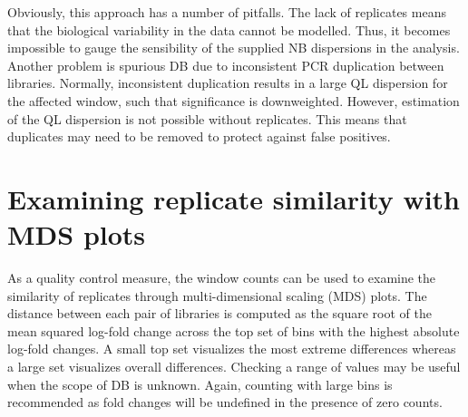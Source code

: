 \documentclass{report}\usepackage[]{graphicx}\usepackage[usenames,dvipsnames]{color}
\newcommand{\hlnum}[1]{\textcolor[rgb]{0.816,0.125,0.439}{#1}}%
\newcommand{\hlopt}[1]{\textcolor[rgb]{0,0,0}{#1}}%
\newcommand{\hlstd}[1]{\textcolor[rgb]{0.251,0.251,0.251}{#1}}%
\newcommand{\hlkwb}[1]{\textcolor[rgb]{0,0,0}{#1}}%
\newcommand{\hlkwc}[1]{\textcolor[rgb]{0.251,0.251,0.251}{#1}}%
\newcommand{\hlkwd}[1]{\textcolor[rgb]{0.878,0.439,0.125}{#1}}%
\newenvironment{knitrout}{}{} %
\begin{document}
\begin{knitrout}
\color{fgcolor}
\end{knitrout}

Obviously, this approach has a number of pitfalls. 
The lack of replicates means that the biological variability in the data cannot be modelled.
Thus, it becomes impossible to gauge the sensibility of the supplied NB dispersions in the analysis.
Another problem is spurious DB due to inconsistent PCR duplication between libraries.
Normally, inconsistent duplication results in a large QL dispersion for the affected window, such that significance is downweighted.
However, estimation of the QL dispersion is not possible without replicates.
This means that duplicates may need to be removed to protect against false positives.

\section{Examining replicate similarity with MDS plots}
As a quality control measure, the window counts can be used to examine the similarity of replicates through multi-dimensional scaling (MDS) plots. 
The distance between each pair of libraries is computed as the square root of the mean squared log-fold change across the top set of bins with the highest absolute log-fold changes.
A small top set visualizes the most extreme differences whereas a large set visualizes overall differences.
Checking a range of  values may be useful when the scope of DB is unknown.
Again, counting with large bins is recommended as fold changes will be undefined in the presence of zero counts.
\end{document}
